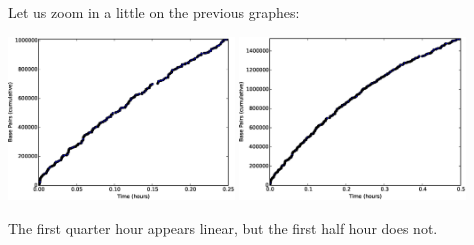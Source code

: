 Let us zoom in a little on the previous graphes:

\includegraphics[width=0.45\textwidth]{q4qh}
\includegraphics[width=0.45\textwidth]{q4hh}

The first quarter hour appears linear, but the first half hour does not.

